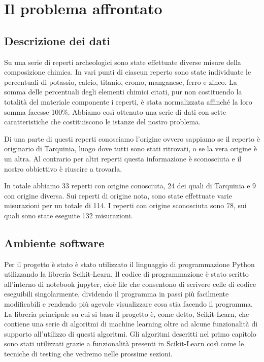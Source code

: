 \documentclass[a4paper,12pt]{report}
\begin{document}
\chapter{Il problema affrontato}
\label{cap2}
\section{Descrizione dei dati}
Su una serie di reperti archeologici sono state effettuate diverse misure della
composizione chimica. In vari punti di ciascun reperto sono state individuate le
percentuali di potassio, calcio, titanio, cromo, manganese, ferro e zinco. La
somma delle percentuali degli elementi chimici citati, pur non costituendo la
totalità del materiale componente i reperti, è stata normalizzata affinché la
loro somma facesse 100\%. Abbiamo così ottenuto una serie di dati con sette
caratteristiche che costituiscono le istanze del nostro problema.


Di una parte di questi reperti conosciamo l'origine ovvero sappiamo se il
reperto è originario di Tarquinia, luogo dove tutti sono stati ritrovati, o se
la vera origine è un altra. Al contrario per altri reperti questa informazione è
sconosciuta e il nostro obbiettivo è riuscire a trovarla.

In totale abbiamo 33 reperti con origine conosciuta, 24 dei quali di Tarquinia e
9 con origine diversa. Sui reperti di origine nota, sono state effettuate varie
misurazioni per un totale di 114. I reperti con origine sconosciuta sono 78,
sui quali sono state eseguite 132 misurazioni.

\section{Ambiente software}
Per il progetto è stato è stato utilizzato il linguaggio di programmazione
Python utilizzando la libreria Scikit-Learn. Il codice di programmazione è stato
scritto all'interno di notebook jupyter, cioè file che consentono di scrivere
celle di codice eseguibili singolarmente, dividendo il programma in passi più
facilmente modificabili e rendendo più agevole visualizzare cosa stia facendo il
programma. La libreria principale su cui si basa il progetto è, come detto,
Scikit-Learn, che contiene una serie di algoritmi di machine
learning oltre ad alcune funzionalità di supporto all'utilizzo di questi
algoritmi. Gli algoritmi descritti nel primo capitolo sono stati utilizzati
grazie a funzionalità presenti in Scikit-Learn così come le tecniche di testing che
vedremo nelle prossime sezioni. 
\end{document}
